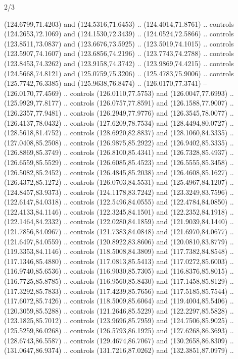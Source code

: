 \begin{flagdescription}{2/3}
\begin{scope}[shift={(0.5\flaglength,0.5)},scale=\flagwidth/320]
\begin{scope}[y=0.8pt, x=0.8pt, yscale=-1,shift={(-118.3,-146)}]
  (124.6799,71.4203) and (124.5316,71.6453) .. (124.4014,71.8761) .. controls
  (124.2653,72.1069) and (124.1530,72.3439) .. (124.0524,72.5866) .. controls
  (123.8511,73.0837) and (123.6676,73.5925) .. (123.5019,74.1015) .. controls
  (123.5907,74.1607) and (123.6856,74.2196) .. (123.7743,74.2788) .. controls
  (123.8453,74.3262) and (123.9158,74.3742) .. (123.9869,74.4215) .. controls
  (124.5668,74.8121) and (125.0759,75.3206) .. (125.4783,75.9006) .. controls
  (125.7742,76.3385) and (125.9638,76.8474) .. (126.0170,77.3741) --
  (126.0170,77.4569) .. controls (126.0110,77.5753) and (126.0047,77.6993) ..
  (125.9929,77.8177) .. controls (126.0757,77.8591) and (126.1588,77.9007) ..
  (126.2357,77.9481) .. controls (126.2949,77.9776) and (126.3545,78.0077) ..
  (126.4137,78.0432) .. controls (127.6209,78.7534) and (128.4494,80.0727) ..
  (128.5618,81.4752) .. controls (128.6920,82.8837) and (128.1060,84.3335) ..
  (127.0408,85.2508) .. controls (126.9875,85.2922) and (126.9402,85.3335) ..
  (126.8869,85.3749) .. controls (126.8100,85.4341) and (126.7328,85.4937) ..
  (126.6559,85.5529) .. controls (126.6085,85.4523) and (126.5555,85.3458) ..
  (126.5082,85.2452) .. controls (126.4845,85.2038) and (126.4608,85.1627) ..
  (126.4372,85.1272) .. controls (126.0703,84.5531) and (125.4967,84.1207) ..
  (124.8457,83.9373) .. controls (124.1178,83.7242) and (123.3249,83.7596) ..
  (122.6147,84.0318) .. controls (122.5496,84.0555) and (122.4784,84.0850) ..
  (122.4133,84.1146) .. controls (122.3245,84.1501) and (122.2352,84.1918) ..
  (122.1464,84.2332) .. controls (122.0280,84.1859) and (121.9039,84.1440) ..
  (121.7856,84.0967) .. controls (121.7383,84.0848) and (121.6970,84.0677) ..
  (121.6497,84.0559) .. controls (120.8922,83.8606) and (120.0810,83.8779) ..
  (119.3353,84.1146) .. controls (118.5008,84.3809) and (117.7382,84.8548) ..
  (117.1346,85.4880) .. controls (117.0813,85.5413) and (117.0272,85.6003) ..
  (116.9740,85.6536) .. controls (116.9030,85.7305) and (116.8376,85.8015) ..
  (116.7725,85.8785) .. controls (116.9560,85.8430) and (117.1458,85.8129) ..
  (117.3292,85.7833) .. controls (117.4239,85.7656) and (117.5185,85.7544) ..
  (117.6072,85.7426) .. controls (118.5009,85.6064) and (119.4004,85.5406) ..
  (120.3059,85.5288) .. controls (121.2646,85.5229) and (122.2297,85.5828) ..
  (123.1825,85.7012) .. controls (123.9696,85.7959) and (124.7506,85.9025) ..
  (125.5259,86.0268) .. controls (126.5793,86.1925) and (127.6268,86.3693) ..
  (128.6743,86.5587) .. controls (129.4674,86.7067) and (130.2658,86.8309) ..
  (131.0647,86.9374) .. controls (131.7216,87.0262) and (132.3851,87.0979) ..

\end{scope}
\end{scope}
\end{flagdescription}
